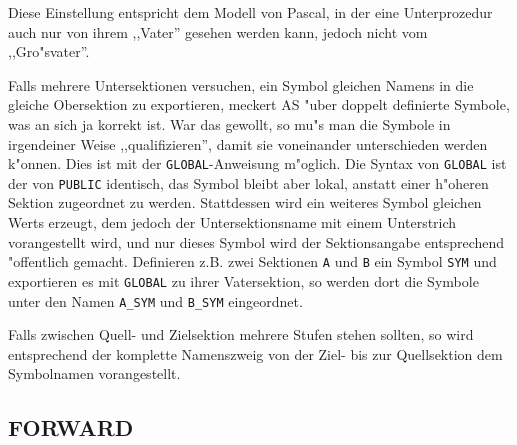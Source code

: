 \documentclass[12pt,a4paper,twoside]{report}
\newcommand{\tty}[1]{{\tt #1}}
\begin{document}
Diese Einstellung entspricht dem Modell von Pascal, in der eine
Unterprozedur auch nur von ihrem ,,Vater'' gesehen werden kann, jedoch
nicht vom ,,Gro"svater''.
\par
Falls mehrere Untersektionen versuchen, ein Symbol gleichen Namens
in die gleiche Obersektion zu exportieren, meckert AS "uber doppelt
definierte Symbole, was an sich ja korrekt ist.  War das gewollt,
so mu"s man die Symbole in irgendeiner Weise ,,qualifizieren'', damit
sie voneinander unterschieden werden k"onnen.  Dies ist mit der
\tty{GLOBAL}-Anweisung m"oglich.  Die Syntax von \tty{GLOBAL} ist
der von \tty{PUBLIC} identisch, das Symbol bleibt aber lokal, anstatt
einer h"oheren Sektion zugeordnet zu werden.  Stattdessen wird ein
weiteres Symbol gleichen Werts erzeugt, dem jedoch der Untersektionsname
mit einem Unterstrich vorangestellt wird, und nur dieses Symbol wird der
Sektionsangabe entsprechend "offentlich gemacht.  Definieren z.B. zwei
Sektionen \tty{A} und \tty{B} ein Symbol \tty{SYM} und exportieren
es mit  \tty{GLOBAL} zu ihrer Vatersektion, so werden dort die Symbole
unter den Namen \tty{A\_SYM} und \tty{B\_SYM} eingeordnet.
\par
Falls zwischen Quell- und Zielsektion mehrere Stufen stehen sollten,
so wird entsprechend der komplette Namenszweig von der Ziel- bis zur
Quellsektion dem Symbolnamen vorangestellt.


\subsection{FORWARD}
\end{document}
